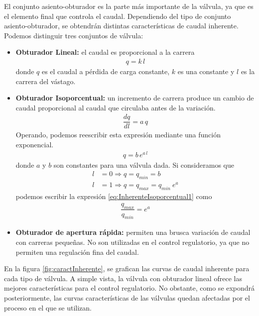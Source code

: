El conjunto asiento-obturador es la parte más importante de la válvula, ya que
es el elemento final que controla el caudal.
Dependiendo del tipo de conjunto asiento-obturador, se obtendrán distintas
características de caudal inherente.
Podemos distinguir tres conjuntos de válvula:
\begin{itemize}
  \item \textbf{Obturador Lineal:} el caudal es proporcional a la carrera
  \begin{align}
	q = k\,l
	\label{eq:inherenteLineal}
  \end{align}
  donde $q$ es el caudal a pérdida de carga constante, $k$ es una constante y
$l$ es la carrera del vástago.

  \item \textbf{Obturador Isoporcentual:}
  un incremento de carrera produce un cambio de caudal proporcional al caudal
que circulaba antes de la variación.
  \begin{align}
    \dfrac{dq}{dl} = a \, q
  \end{align}
  Operando, podemos reescribir esta expresión mediante una función exponencial.
\begin{align}
 q = b\,e^{a\,l}
 \label{eq:InherenteIsoporcentual1}
\end{align}
  donde $a$ y $b$ son constantes para una válvula dada.
  Si consideramos que
    \begin{align}
        l &= 0 \Rightarrow q = q_{min} = b\\
        l &= 1 \Rightarrow q = q_{max} = q_{min} \:e^a
    \end{align}
    podemos escribir la expresión \eqref{eq:InherenteIsoporcentual1} como
    \begin{align}
      \dfrac{q_{max}}{q_{min}} = e^a
    \end{align}
  \item \textbf{Obturador de apertura rápida:} permiten una brusca variación de
caudal con carreras pequeñas.
  No son utilizadas en el control regulatorio, ya que no permiten una
regulación fina del caudal.
\end{itemize}

En la figura \ref{fig:caractInherente}, se grafican las curvas de caudal
inherente para cada tipo de válvula.
A simple vista, la válvula con obturador lineal ofrece las mejores
características para el control regulatorio.
No obstante, como se expondrá posteriormente, las curvas características de las
válvulas quedan afectadas por el proceso en el que se utilizan.

